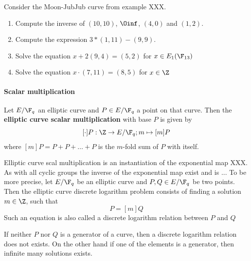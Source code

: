 \begin{exercise}
Consider the Moon-JubJub curve from example XXX. 
\begin{enumerate}
\item Compute the inverse of $(10,10)$, $\Oinf$, $(4,0)$ and $(1,2)$.
\item Compute the expression $3*(1,11) - (9,9)$.
\item Solve the equation $x + 2(9,4) = (5,2) $ for $x\in E_1(\F_{13})$
\item Solve the equation $x\cdot (7,11) = (8,5)$ for $x\in \Z$
\end{enumerate}
\end{exercise}
\paragraph{Scalar multiplication}
Let $E/\F_q$ an elliptic curve and $P\in E/\F_q$ a point on that curve. Then the \textbf{elliptic curve scalar multiplication} with base $P$ is given by
$$
[\cdot]P: \Z \to E/\F_q; m \mapsto [m]P
$$
where $[m]P = P+P+\ldots + P$ is the $m$-fold sum of $P$ with itself. 

Elliptic curve scal multiplication is an instantiation of the exponential map XXX. As with all cyclic groups the inverse of the exponential map exist and is ... To be more precise, let $E/\F_q$ be an elliptic curve and $P,Q\in E/\F_q$ be two points. Then the elliptic curve discrete logarithm problem consists of finding a solution $m\in\Z$, such that
\begin{equation}
P = [m]Q
\end{equation}
Such an equation is also called a discrete logarithm relation between $P$ and $Q$

If neither $P$ nor $Q$ is a generator of a curve, then a discrete logarithm relation does not exists. On the other hand if one of the elements is a generator, then infinite many solutions exists. 

